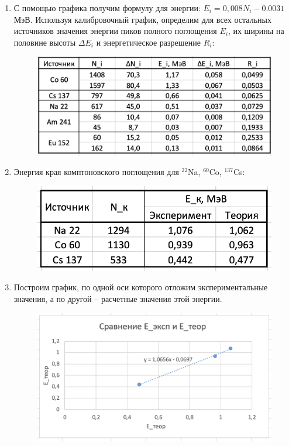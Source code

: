 \documentclass[a4paper, 12pt]{article}%
\begin{document}
\begin{enumerate}
	\item С помощью графика получим формулу для энергии: $ E_i = 0,008N_i - 0.0031$ МэВ.  Используя калибровочный график,  определим для всех остальных источников значения энергии пиков полного поглощения $ E_i $, их ширины на половине высоты $\Delta E_i$ и энергетическое разрешение $ R_i $:
	
\begin{figure}[h!]
	\centering
	\includegraphics[scale=0.7]{Таблица_1.PNG}
\end{figure}

	\item Энергия края комптоновского поглощения для $^{22}$Na, $^{60}$Co, $^{137}$Cs:
	
\begin{figure}[h!]
	\centering
	\includegraphics[scale=0.7]{Таблица_2.PNG}
\end{figure}

\newpage

	\item Построим график,  по одной оси которого отложим экспериментальные значения,  а по другой -- расчетные значения этой энергии. 
	
\begin{figure}[h!]
	\centering
	\includegraphics[scale=0.7]{График_2.PNG}
\end{figure}


\end{enumerate}
\end{document}
